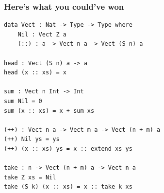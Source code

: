 \documentclass{beamer}
\begin{document}
  \begin{frame}[fragile]
    \frametitle{Here's what you could've won}
    \begin{verbatim}
data Vect : Nat -> Type -> Type where
    Nil : Vect Z a
    (::) : a -> Vect n a -> Vect (S n) a

head : Vect (S n) a -> a
head (x :: xs) = x

sum : Vect n Int -> Int
sum Nil = 0
sum (x :: xs) = x + sum xs

(++) : Vect n a -> Vect m a -> Vect (n + m) a
(++) Nil ys = ys
(++) (x :: xs) ys = x :: extend xs ys

take : n -> Vect (n + m) a -> Vect n a
take Z xs = Nil
take (S k) (x :: xs) = x :: take k xs
    \end{verbatim}
\end{frame}
  
\end{document}
